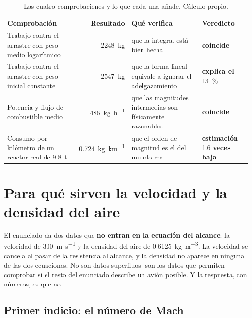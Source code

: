 \documentclass[11pt,letterpaper]{article}
\begin{document}
\begin{table}[htbp]
\small
\caption{Las cuatro comprobaciones y lo que cada una añade. Cálculo propio.}
\label{cuadro:comprobaciones}
\begin{tabularx}{\textwidth}{@{}p{4.0cm}rXl@{}}
\toprule
\textbf{Comprobación} & \textbf{Resultado} & \textbf{Qué verifica} &
\textbf{Veredicto} \\
\midrule
Trabajo contra el arrastre con peso medio logarítmico
& \SI{2248}{\kilogram}
& que la integral está bien hecha
& \textcolor{cVerde}{\textbf{coincide}} \\
Trabajo contra el arrastre con peso inicial constante
& \SI{2547}{\kilogram}
& que la forma lineal equivale a ignorar el adelgazamiento
& \textcolor{cVerde}{\textbf{explica el} \boldmath\SI{13}{\percent}} \\
Potencia y flujo de combustible medio
& \SI{486}{\kilogram\per\hour}
& que las magnitudes intermedias son físicamente razonables
& \textcolor{cVerde}{\textbf{coincide}} \\
Consumo por kilómetro de un reactor real de \SI{9.8}{\tonne}
& \SI{0.724}{\kilogram\per\kilo\meter}
& que el orden de magnitud es el del mundo real
& \textcolor{cAviso}{\textbf{estimación} \boldmath\num{1.6}\textbf{ veces
  baja}} \\
\bottomrule
\end{tabularx}
\end{table}

\section{Para qué sirven la velocidad y la densidad del aire}
\label{sec:coherencia}

El enunciado da dos datos que \textbf{no entran en la ecuación del alcance}: la
velocidad de \SI{300}{\meter\per\second} y la densidad del aire de
\SI{0.6125}{\kilogram\per\meter\cubed}. La velocidad se cancela al pasar de la
resistencia al alcance, y la densidad no aparece en ninguna de las dos
ecuaciones. No son datos superfluos: son los datos que permiten comprobar si el
resto del enunciado describe un avión posible. Y la respuesta, con números, es
que no.

\subsection{Primer indicio: el número de Mach}
\end{document}
